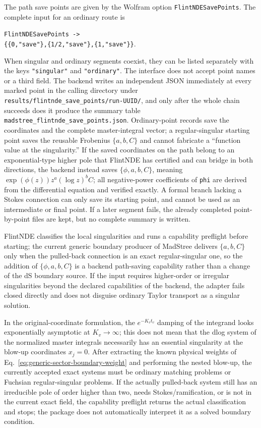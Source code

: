 \documentclass[11pt,a4paper]{article}
\begin{document}
The path save points are given by the Wolfram option \texttt{FlintNDESavePoints}. The complete input for an ordinary route is
\begin{center}
 \texttt{FlintNDESavePoints ->}\\
 \texttt{\{\{0,"save"\},\{1/2,"save"\},\{1,"save"\}\}}.
\end{center}
When singular and ordinary segments coexist, they can be listed separately with the keys \texttt{"singular"} and \texttt{"ordinary"}. The interface does not accept point names or a third field. The backend writes an independent JSON immediately at every marked point in the calling directory under \texttt{results/flintnde\_save\_points/run-UUID/}, and only after the whole chain succeeds does it produce the summary table \texttt{madstree\_flintnde\_save\_points.json}. Ordinary-point records save the coordinates and the complete master-integral vector; a regular-singular starting point saves the reusable Frobenius $\{a,b,C\}$ and cannot fabricate a ``function value at the singularity.'' If the saved coordinates on the path belong to an exponential-type higher pole that FlintNDE has certified and can bridge in both directions, the backend instead saves $\{\phi,a,b,C\}$, meaning $\exp(\phi(z))z^a(\log z)^bC$; all negative-power coefficients of \texttt{phi} are derived from the differential equation and verified exactly. A formal branch lacking a Stokes connection can only save its starting point, and cannot be used as an intermediate or final point. If a later segment fails, the already completed point-by-point files are kept, but no complete summary is written.

FlintNDE classifies the local singularities and runs a capability preflight before starting; the current generic boundary producer of MadStree delivers $\{a,b,C\}$ only when the pulled-back connection is an exact regular-singular one, so the addition of $\{\phi,a,b,C\}$ is a backend path-saving capability rather than a change of the dS boundary source. If the input requires higher-order or irregular singularities beyond the declared capabilities of the backend, the adapter fails closed directly and does not disguise ordinary Taylor transport as a singular solution.

In the original-coordinate formulation, the $e^{-K_vt_v}$ damping of the integrand looks exponentially asymptotic at $K_v\to\infty$; this does not mean that the dlog system of the normalized master integrals necessarily has an essential singularity at the blow-up coordinates $x_j=0$. After extracting the known physical weights of Eq.~\eqref{eq:generic-sector-boundary-weight} and performing the nested blow-up, the currently accepted exact systems must be ordinary matching problems or Fuchsian regular-singular problems. If the actually pulled-back system still has an irreducible pole of order higher than two, needs Stokes/ramification, or is not in the current exact field, the capability preflight returns the actual classification and stops; the package does not automatically interpret it as a solved boundary condition.
\end{document}
